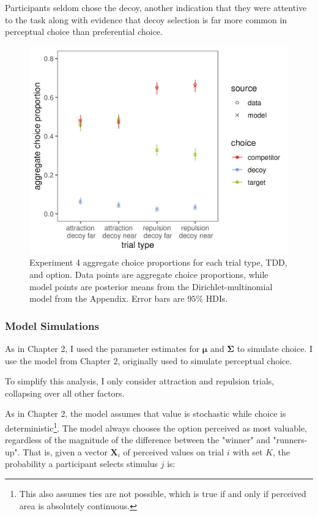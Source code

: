 Participants seldom chose the decoy, another indication that they were attentive to the task along with evidence that decoy selection is far more common in perceptual choice than preferential choice.

\begin{figure}
    \includegraphics{figures/bayes_choice_model_data_plot.jpeg}
    \caption{Experiment 4 aggregate choice proportions for each trial type, TDD, and option. Data points are aggregate choice proportions, while model points are posterior means from the Dirichlet-multinomial model from the Appendix. Error bars are $95\%$ HDIs.}
    \label{fig:bayes_choice_model_data_plot}
\end{figure}

\subsubsection{Model Simulations}

As in Chapter 2, I used the parameter estimates for $\boldsymbol{\mu}$ and $\boldsymbol{\Sigma}$ to simulate choice. I use the model from Chapter 2, originally used to simulate perceptual choice. 

To simplify this analysis, I only consider attraction and repulsion trials, collapsing over all other factors. 

As in Chapter 2, the model assumes that value is stochastic while choice is deterministic\footnote{This also assumes ties are not possible, which is true if and only if perceived area is absolutely continuous.}. The model always chooses the option perceived as most valuable, regardless of the magnitude of the difference between the "winner" and "runners-up". That is, given a vector $\mathbf{X}_i$ of perceived values on trial $i$ with set $K$, the probability a participant selects stimulus $j$ is:


